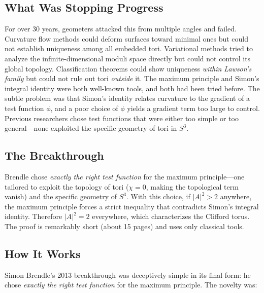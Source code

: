 \subsection{What Was Stopping Progress}

For over 30 years, geometers attacked this from multiple angles and failed. Curvature flow methods could deform surfaces toward minimal ones but could not establish uniqueness among all embedded tori. Variational methods tried to analyze the infinite-dimensional moduli space directly but could not control its global topology. Classification theorems could show uniqueness \emph{within Lawson's family} but could not rule out tori \emph{outside} it. The maximum principle and Simon's integral identity were both well-known tools, and both had been tried before. The subtle problem was that Simon's identity relates curvature to the gradient of a test function $\phi$, and a poor choice of $\phi$ yields a gradient term too large to control. Previous researchers chose test functions that were either too simple or too general---none exploited the specific geometry of tori in $S^3$.

\subsection{The Breakthrough}

Brendle chose \emph{exactly the right test function} for the maximum principle---one tailored to exploit the topology of tori ($\chi = 0$, making the topological term vanish) and the specific geometry of $S^3$. With this choice, if $|A|^2 > 2$ anywhere, the maximum principle forces a strict inequality that contradicts Simon's integral identity. Therefore $|A|^2 = 2$ everywhere, which characterizes the Clifford torus. The proof is remarkably short (about 15 pages) and uses only classical tools.

\subsection{How It Works}

Simon Brendle's 2013 breakthrough was deceptively simple in its final form: he chose \emph{exactly the right test function} for the maximum principle. The novelty was:

